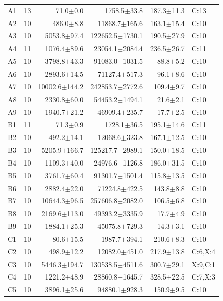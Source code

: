 \noindent\begin{supertabular}{@{}lrrrrl@{}}
A1 & 13 & 71.0$\pm$0.0 & 1758.5$\pm$33.8 & 187.3$\pm$11.3 & C:13 \\
A2 & 10 & 486.0$\pm$8.8 & 11868.7$\pm$165.6 & 163.1$\pm$15.4 & C:10 \\
A3 & 10 & 5053.8$\pm$97.4 & 122652.5$\pm$1730.1 & 190.5$\pm$27.9 & C:10 \\
A4 & 11 & 1076.4$\pm$89.6 & 23054.1$\pm$2084.4 & 236.5$\pm$26.7 & C:11 \\
A5 & 10 & 3798.8$\pm$43.3 & 91083.0$\pm$1031.5 & 88.8$\pm$5.2 & C:10 \\
A6 & 10 & 2893.6$\pm$14.5 & 71127.4$\pm$517.3 & 96.1$\pm$8.6 & C:10 \\
A7 & 10 & 10002.6$\pm$144.2 & 242853.7$\pm$2772.6 & 109.4$\pm$9.7 & C:10 \\
A8 & 10 & 2330.8$\pm$60.0 & 54453.2$\pm$1494.1 & 21.6$\pm$2.1 & C:10 \\
A9 & 10 & 1940.7$\pm$21.2 & 46909.4$\pm$235.7 & 17.7$\pm$2.5 & C:10 \\
B1 & 11 & 71.3$\pm$0.9 & 1728.1$\pm$36.5 & 195.1$\pm$14.6 & C:11 \\
B2 & 10 & 492.2$\pm$14.1 & 12068.6$\pm$323.8 & 167.1$\pm$12.5 & C:10 \\
B3 & 10 & 5205.9$\pm$166.7 & 125217.7$\pm$2989.1 & 150.0$\pm$18.5 & C:10 \\
B4 & 10 & 1109.3$\pm$40.0 & 24976.6$\pm$1126.8 & 186.0$\pm$31.5 & C:10 \\
B5 & 10 & 3761.7$\pm$60.4 & 91301.7$\pm$1501.4 & 115.8$\pm$13.5 & C:10 \\
B6 & 10 & 2882.4$\pm$22.0 & 71224.8$\pm$422.5 & 143.8$\pm$8.8 & C:10 \\
B7 & 10 & 10644.3$\pm$96.5 & 257606.8$\pm$2082.0 & 106.5$\pm$6.8 & C:10 \\
B8 & 10 & 2169.6$\pm$113.0 & 49393.2$\pm$3335.9 & 17.7$\pm$4.9 & C:10 \\
B9 & 10 & 1884.1$\pm$25.3 & 45075.8$\pm$729.3 & 14.3$\pm$3.1 & C:10 \\
C1 & 10 & 80.6$\pm$15.5 & 1987.7$\pm$394.1 & 210.6$\pm$8.3 & C:10 \\
C2 & 10 & 498.9$\pm$12.2 & 12082.0$\pm$451.0 & 217.9$\pm$13.8 & C:6,X:4 \\
C3 & 10 & 5446.3$\pm$194.7 & 130538.5$\pm$4511.6 & 300.7$\pm$29.1 & X:9,C:1 \\
C4 & 10 & 1221.2$\pm$48.9 & 28860.8$\pm$1645.7 & 328.5$\pm$22.5 & C:7,X:3 \\
C5 & 10 & 3896.1$\pm$25.6 & 94880.1$\pm$928.3 & 150.9$\pm$9.5 & C:10 \\

\end{supertabular}
